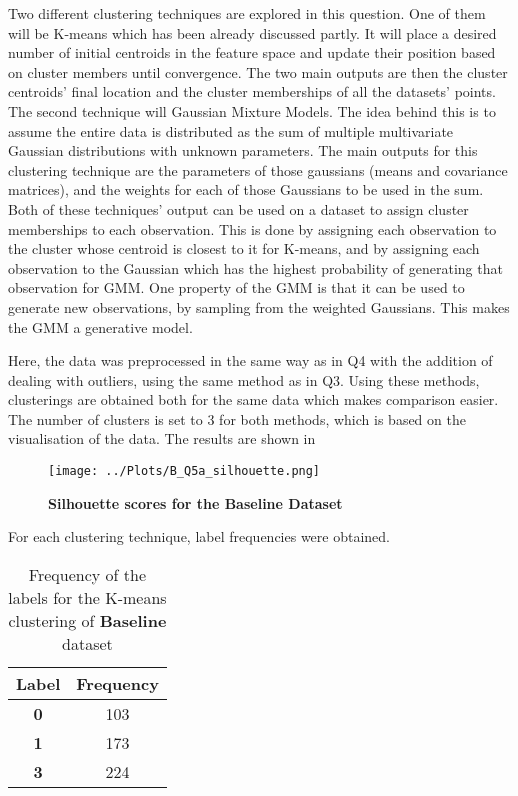 \documentclass[12pt]{report} %
\begin{document}
Two different clustering techniques are explored in this question. One of them will be K-means which has been already discussed partly. It will place a desired number of initial centroids in the feature space and update their position based on cluster members until convergence. The two main outputs are then the cluster centroids' final location and the cluster memberships of all the datasets' points.  
The second technique will Gaussian Mixture Models. The idea behind this is to assume the entire data is distributed as the sum of multiple multivariate Gaussian distributions with unknown parameters\cite[p. 260]{sklearn_book}. The main outputs for this clustering technique are the parameters of those gaussians (means and covariance matrices), and the weights for each of those Gaussians to be used in the sum.  
Both of these techniques' output can be used on a dataset to assign cluster memberships to each observation. This is done by assigning each observation to the cluster whose centroid is closest to it for K-means, and by assigning each observation to the Gaussian which has the highest probability of generating that observation for GMM. One property of the GMM is that it can be used to generate new observations, by sampling from the weighted Gaussians. This makes the GMM a generative model.  

Here, the data was preprocessed in the same way as in Q4 with the addition of dealing with outliers, using the same method as in Q3.
Using these methods, clusterings are obtained both for the same data which makes comparison easier. The number of clusters is set to 3 for both methods, which is based on the visualisation of the data. The results are shown in

\begin{figure}[htbp]
    \centering
    \texttt{[image: ../Plots/B\_Q5a\_silhouette.png]}
    \caption{\textbf{Silhouette scores for the Baseline Dataset}}
\end{figure}

For each clustering technique, label frequencies were obtained.

\begin{table}[h]
    \centering
    \begin{tabular}{ |c|c| }
        \hline
        \textbf{Label} & \textbf{Frequency} \\
        \hline
        \textbf{0} & 103 \\ 
        \hline
        \textbf{1} & 173 \\
        \hline
        \textbf{3} & 224 \\
        \hline
    \end{tabular}
    \caption{Frequency of the labels for the K-means clustering of \textbf{Baseline} dataset}
\end{table}
\end{document}
